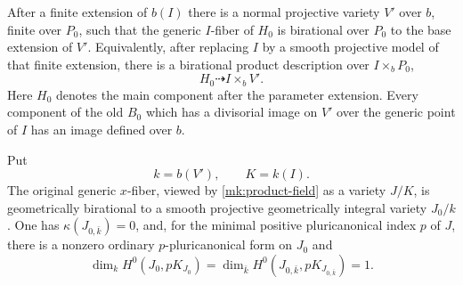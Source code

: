 \begin{proposition}\label{mk:product}
After a finite extension of $b(I)$ there is a normal projective variety
$V'$ over $b$, finite over $P_0$, such that the generic $I$-fiber of
$H_0$ is birational over $P_0$ to the base extension of $V'$.  Equivalently,
after replacing $I$ by a smooth projective model of that finite extension,
there is a birational product description over $I\times_bP_0$,
\begin{equation}\label{mk:product-field}
 H_0\dashrightarrow I\times_b V'.
\end{equation}
Here $H_0$ denotes the main component after the parameter extension.
Every component of the old $B_0$ which has a divisorial image on $V'$
over the generic point of $I$ has an image defined over $b$.

Put
\begin{equation}\label{mk:fields}
 k=b(V'),\qquad K=k(I).
\end{equation}
The original generic $x$-fiber, viewed by \eqref{mk:product-field} as a
variety $J/K$, is geometrically birational to a smooth projective
geometrically integral variety $J_0/k$.  One has
$\kappa(J_{0,\bar k})=0$, and, for the minimal positive pluricanonical
index $p$ of $J$, there is a nonzero ordinary $p$-pluricanonical form on
$J_0$ and
\begin{equation}\label{mk:reference-form}
 \dim_k H^0(J_0,pK_{J_0})
 =\dim_{\bar k}H^0(J_{0,\bar k},pK_{J_{0,\bar k}})=1.
\end{equation}
\end{proposition}

